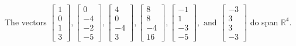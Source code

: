 \begin{exercise}
\begin{exerciseStatement}
  \end{exerciseStatement}
  \begin{exerciseAnswer}
   The vectors \(\left[\begin{array}{r}
1 \\
0 \\
1 \\
3
\end{array}\right] , \left[\begin{array}{r}
0 \\
-4 \\
-2 \\
-5
\end{array}\right] , \left[\begin{array}{r}
4 \\
0 \\
-4 \\
3
\end{array}\right] , \left[\begin{array}{r}
8 \\
8 \\
-4 \\
16
\end{array}\right] , \left[\begin{array}{r}
-1 \\
1 \\
-3 \\
-5
\end{array}\right] , \text{ and } \left[\begin{array}{r}
-3 \\
3 \\
3 \\
-3
\end{array}\right]\) 
  	 do  
	span \(\mathbb{R}^4\).
  


  \end{exerciseAnswer}
\end{exercise}